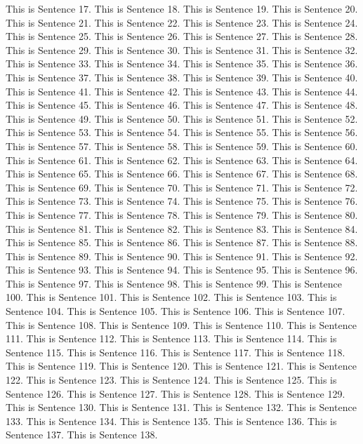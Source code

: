 \documentclass{article}
\begin{document}
This is Sentence 17.
This is Sentence 18.
This is Sentence 19.
This is Sentence 20.
This is Sentence 21.
This is Sentence 22.
This is Sentence 23.
This is Sentence 24.
This is Sentence 25.
This is Sentence 26.
This is Sentence 27.
This is Sentence 28.
This is Sentence 29.
This is Sentence 30.
This is Sentence 31.
This is Sentence 32.
This is Sentence 33.
This is Sentence 34.
This is Sentence 35.
This is Sentence 36.
This is Sentence 37.
This is Sentence 38.
This is Sentence 39.
This is Sentence 40.
This is Sentence 41.
This is Sentence 42.
This is Sentence 43.
This is Sentence 44.
This is Sentence 45.
This is Sentence 46.
This is Sentence 47.
This is Sentence 48.
This is Sentence 49.
This is Sentence 50.
This is Sentence 51.
This is Sentence 52.
This is Sentence 53.
This is Sentence 54.
This is Sentence 55.
This is Sentence 56.
This is Sentence 57.
This is Sentence 58.
This is Sentence 59.
This is Sentence 60.
This is Sentence 61.
This is Sentence 62.
This is Sentence 63.
This is Sentence 64.
This is Sentence 65.
This is Sentence 66.
This is Sentence 67.
This is Sentence 68.
This is Sentence 69.
This is Sentence 70.
This is Sentence 71.
This is Sentence 72.
This is Sentence 73.
This is Sentence 74.
This is Sentence 75.
This is Sentence 76.
This is Sentence 77.
This is Sentence 78.
This is Sentence 79.
This is Sentence 80.
This is Sentence 81.
This is Sentence 82.
This is Sentence 83.
This is Sentence 84.
This is Sentence 85.
This is Sentence 86.
This is Sentence 87.
This is Sentence 88.
This is Sentence 89.
This is Sentence 90.
This is Sentence 91.
This is Sentence 92.
This is Sentence 93.
This is Sentence 94.
This is Sentence 95.
This is Sentence 96.
This is Sentence 97.
This is Sentence 98.
This is Sentence 99.
This is Sentence 100.
This is Sentence 101.
This is Sentence 102.
This is Sentence 103.
This is Sentence 104.
This is Sentence 105.
This is Sentence 106.
This is Sentence 107.
This is Sentence 108.
This is Sentence 109.
This is Sentence 110.
This is Sentence 111.
This is Sentence 112.
This is Sentence 113.
This is Sentence 114.
This is Sentence 115.
This is Sentence 116.
This is Sentence 117.
This is Sentence 118.
This is Sentence 119.
This is Sentence 120.
This is Sentence 121.
This is Sentence 122.
This is Sentence 123.
This is Sentence 124.
This is Sentence 125.
This is Sentence 126.
This is Sentence 127.
This is Sentence 128.
This is Sentence 129.
This is Sentence 130.
This is Sentence 131.
This is Sentence 132.
This is Sentence 133.
This is Sentence 134.
This is Sentence 135.
This is Sentence 136.
This is Sentence 137.
This is Sentence 138.
\end{document}
